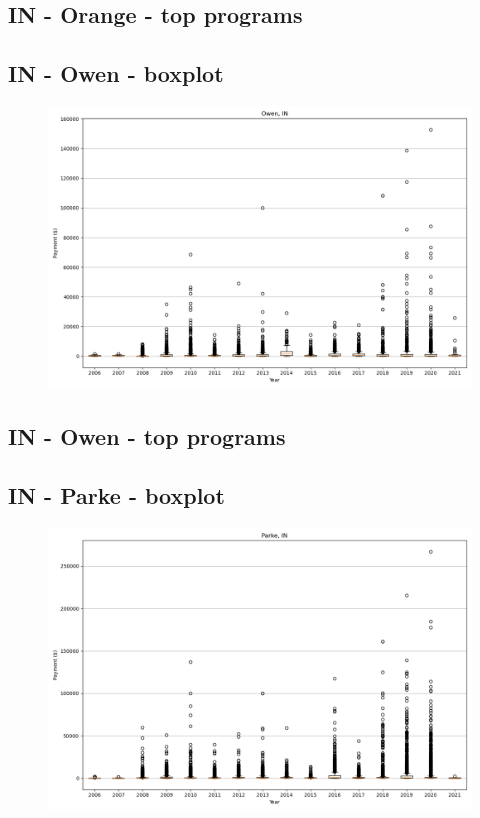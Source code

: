 \subsection*{IN - Orange - top programs}

\newpage
\subsection*{IN - Owen - boxplot}
\begin{figure}[h]
\centering
\includegraphics[width=7in]{../output/boxplots/counties/Owen-IN_boxplot.png}
\end{figure}


\subsection*{IN - Owen - top programs}

\newpage
\subsection*{IN - Parke - boxplot}
\begin{figure}[h]
\centering
\includegraphics[width=7in]{../output/boxplots/counties/Parke-IN_boxplot.png}
\end{figure}


